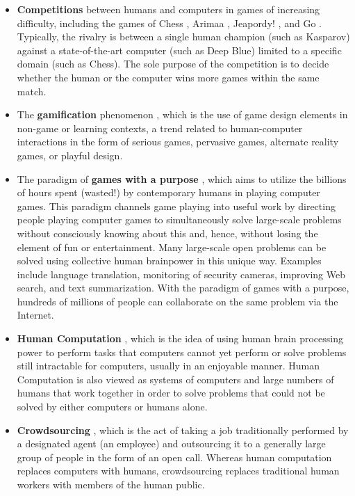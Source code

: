 \begin{itemize}
	\item 	\textbf{Competitions} between humans and computers in games of increasing difficulty, including the games of Chess \cite{hsu2002behind}, Arimaa \cite{syed2003arimaa}, Jeapordy! \cite{ferrucci2013watson}, and Go \cite{gelly2011monte}. Typically, the rivalry is between a single human champion (such as Kasparov) against a state-of-the-art computer (such as Deep Blue) limited to a specific domain (such as Chess). The sole purpose of the competition is to decide whether the human or the computer wins more games within the same match.
	
	\item The \textbf{gamification} phenomenon \cite{seaborn2015gamification,dubbels2013gamification,boughzala2016introduction}, which is the use of game design elements in non-game or learning contexts, a trend related to human-computer interactions in the form of serious games, pervasive games, alternate reality games, or playful design.
	
	\item The paradigm of \textbf{games with a purpose} \cite{von2006games,von2008designing,siorpaes2008games,good2011games,jain2008game}, which aims to utilize the billions of hours spent (wasted!) by contemporary humans in playing computer games. This paradigm channels game playing into useful work by directing people playing computer games to simultaneously solve large-scale problems without consciously knowing about this and, hence, without losing the element of fun or entertainment. Many large-scale open problems can be solved using collective human brainpower in this unique way. Examples include language translation, monitoring of security cameras, improving Web search, and text summarization. With the paradigm of games with a purpose, hundreds of millions of people can collaborate on the same problem via the Internet.
	
	\item \textbf{Human Computation} \cite{quinn2011human}, which is the idea of using human brain processing power to perform tasks that computers cannot yet perform or solve problems still intractable for computers, usually in an enjoyable manner. Human Computation is also viewed as systems of computers and large numbers of humans that work together in order to solve problems that could not be solved by either computers or humans alone.
	
	\item \textbf{Crowdsourcing} \cite{brabham2008crowdsourcing}, which is the act of taking a job traditionally performed by a designated agent (an employee) and outsourcing it to a generally large group of people in the form of an open call. Whereas human computation replaces computers with humans, crowdsourcing replaces traditional human workers with members of the human public.
\end{itemize}

